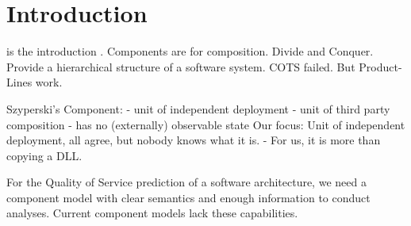 \section{Introduction}
 is the introduction \cite{balsamo2004b}.
Components are for composition.
Divide and Conquer. 
Provide a hierarchical structure of a software system.
COTS failed. 
But Product-Lines work.

Szyperski's Component:
-	unit of independent deployment
-	unit of third party composition
-	has no (externally) observable state
Our focus: Unit of independent deployment, all agree, but nobody knows what it is. - For us, it is more than copying a DLL.

For the Quality of Service prediction of a software architecture, we need a component model with clear semantics and enough information to conduct analyses. Current component models lack these capabilities.
